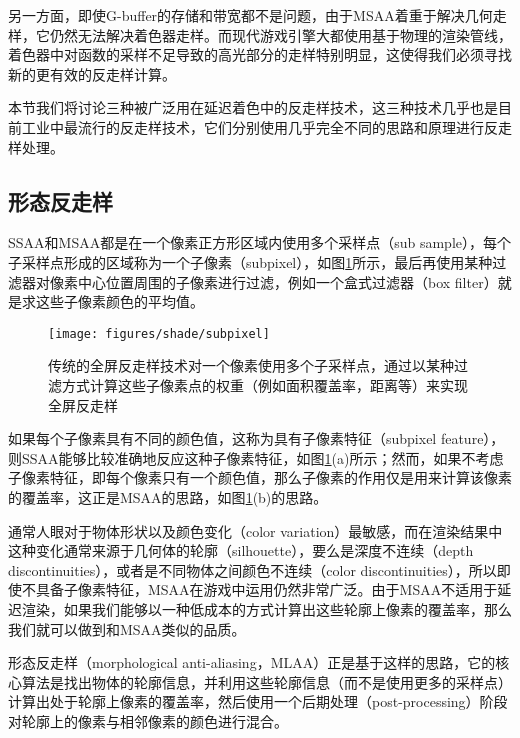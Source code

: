 另一方面，即使G-buffer的存储和带宽都不是问题，由于MSAA着重于解决几何走样，它仍然无法解决着色器走样。而现代游戏引擎大都使用基于物理的渲染管线，着色器中对函数的采样不足导致的高光部分的走样特别明显，这使得我们必须寻找新的更有效的反走样计算。

本节我们将讨论三种被广泛用在延迟着色中的反走样技术，这三种技术几乎也是目前工业中最流行的反走样技术，它们分别使用几乎完全不同的思路和原理进行反走样处理。




\subsection{形态反走样}
SSAA和MSAA都是在一个像素正方形区域内使用多个采样点（sub sample），每个子采样点形成的区域称为一个子像素（subpixel），如图\ref{f:shade-subpixel}所示，最后再使用某种过滤器对像素中心位置周围的子像素进行过滤，例如一个盒式过滤器（box filter）就是求这些子像素颜色的平均值。

\begin{figure}
	\sidecaption
	\texttt{[image: figures/shade/subpixel]}
	\caption{传统的全屏反走样技术对一个像素使用多个子采样点，通过以某种过滤方式计算这些子像素点的权重（例如面积覆盖率，距离等）来实现全屏反走样}
	\label{f:shade-subpixel}
\end{figure}

如果每个子像素具有不同的颜色值，这称为具有子像素特征（subpixel feature），则SSAA能够比较准确地反应这种子像素特征，如图\ref{f:shade-subpixel}(a)所示；然而，如果不考虑子像素特征，即每个像素只有一个颜色值，那么子像素的作用仅是用来计算该像素的覆盖率，这正是MSAA的思路，如图\ref{f:shade-subpixel}(b)的思路。

通常人眼对于物体形状以及颜色变化（color variation）最敏感，而在渲染结果中这种变化通常来源于几何体的轮廓（silhouette），要么是深度不连续（depth discontinuities），或者是不同物体之间颜色不连续（color discontinuities），所以即使不具备子像素特征，MSAA在游戏中运用仍然非常广泛。由于MSAA不适用于延迟渲染，如果我们能够以一种低成本的方式计算出这些轮廓上像素的覆盖率，那么我们就可以做到和MSAA类似的品质。

形态反走样\cite{a:MorphologicalAntialiasing}（morphological anti-aliasing，MLAA）正是基于这样的思路，它的核心算法是找出物体的轮廓信息，并利用这些轮廓信息（而不是使用更多的采样点）计算出处于轮廓上像素的覆盖率，然后使用一个后期处理（post-processing）阶段对轮廓上的像素与相邻像素的颜色进行混合。

